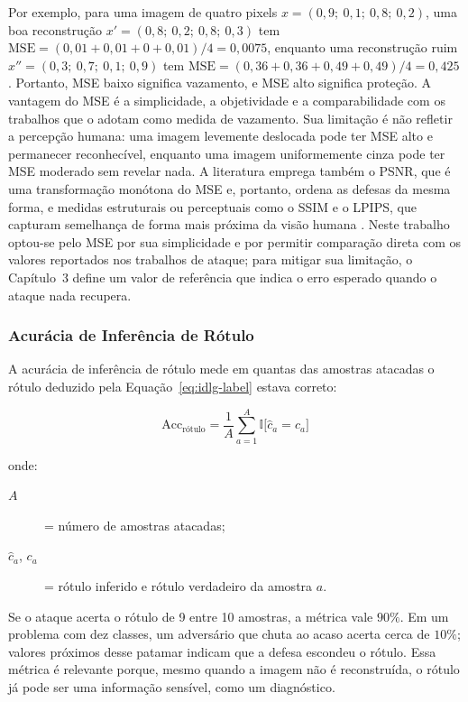 Por exemplo, para uma imagem de quatro pixels $x = (0{,}9;\ 0{,}1;\ 0{,}8;\ 0{,}2)$, uma boa reconstrução $x' = (0{,}8;\ 0{,}2;\ 0{,}8;\ 0{,}3)$ tem $\mathrm{MSE} = (0{,}01 + 0{,}01 + 0 + 0{,}01)/4 = 0{,}0075$, enquanto uma reconstrução ruim $x'' = (0{,}3;\ 0{,}7;\ 0{,}1;\ 0{,}9)$ tem $\mathrm{MSE} = (0{,}36 + 0{,}36 + 0{,}49 + 0{,}49)/4 = 0{,}425$. Portanto, MSE baixo significa vazamento, e MSE alto significa proteção. A vantagem do MSE é a simplicidade, a objetividade e a comparabilidade com os trabalhos que o adotam como medida de vazamento. Sua limitação é não refletir a percepção humana: uma imagem levemente deslocada pode ter MSE alto e permanecer reconhecível, enquanto uma imagem uniformemente cinza pode ter MSE moderado sem revelar nada. A literatura emprega também o PSNR, que é uma transformação monótona do MSE e, portanto, ordena as defesas da mesma forma, e medidas estruturais ou perceptuais como o SSIM e o LPIPS, que capturam semelhança de forma mais próxima da visão humana \cite{Huang2021,Yin2021}. Neste trabalho optou-se pelo MSE por sua simplicidade e por permitir comparação direta com os valores reportados nos trabalhos de ataque; para mitigar sua limitação, o Capítulo~3 define um valor de referência que indica o erro esperado quando o ataque nada recupera.

\subsubsection{Acurácia de Inferência de Rótulo}

A acurácia de inferência de rótulo mede em quantas das amostras atacadas o rótulo deduzido pela Equação~\ref{eq:idlg-label} estava correto:

\begin{equation} \label{eq:label-acc}
\mathrm{Acc}_{\text{rótulo}} = \frac{1}{A} \sum_{a=1}^{A} \mathbb{I}\big[\hat{c}_a = c_a\big]
\end{equation}

\noindent onde:
\begin{description}
  \item[$A$] = número de amostras atacadas;
  \item[$\hat{c}_a$, $c_a$] = rótulo inferido e rótulo verdadeiro da amostra $a$.
\end{description}

Se o ataque acerta o rótulo de 9 entre 10 amostras, a métrica vale $90\%$. Em um problema com dez classes, um adversário que chuta ao acaso acerta cerca de $10\%$; valores próximos desse patamar indicam que a defesa escondeu o rótulo. Essa métrica é relevante porque, mesmo quando a imagem não é reconstruída, o rótulo já pode ser uma informação sensível, como um diagnóstico.

